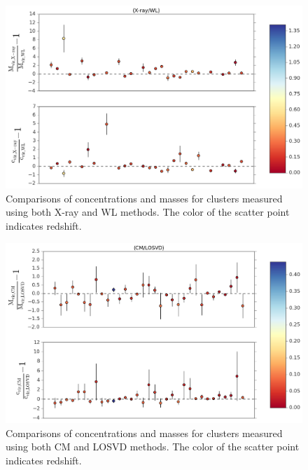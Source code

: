 \begin{figure}
\begin{center}
  \includegraphics[width=1.0\textwidth]{./images/CMRelationProject/X-ray_WL_Comparison.png}
\end{center}
\caption[X-ray and WL Cluster Measurements]{Comparisons of concentrations and masses for clusters measured
  using both X-ray and WL methods. The color of the scatter point indicates
redshift.}
\end{figure}

\begin{figure}
\begin{center}
\includegraphics[width=1.0\textwidth]{./images/CMRelationProject/CM_LOSVD_Comparison.png}
\end{center}
\caption[CM and LOSVD Cluster Measurements]{Comparisons of concentrations and masses for clusters measured
  using both CM and LOSVD methods. The color of the scatter point indicates
redshift.}
\end{figure}

